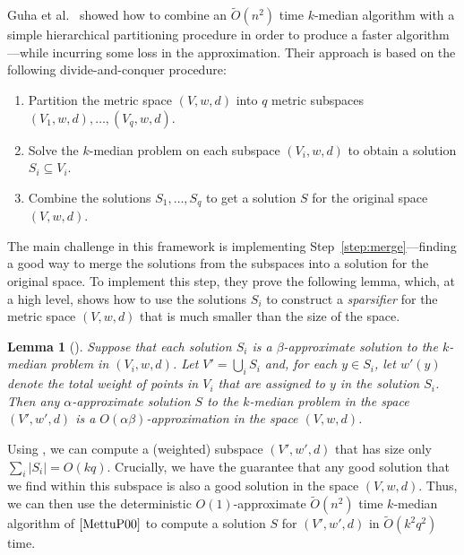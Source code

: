 \documentclass[11pt]{article}
\newcommand{\1}{\mathmybb{1}}
\newtheorem{lemma}[theorem]{Lemma}
\begin{document}
Guha et al.~\cite{focs/GuhaMMO00} showed how to combine an $\tilde O(n^2)$ time $k$-median algorithm with a simple hierarchical partitioning procedure in order to produce a faster algorithm---while incurring some loss in the approximation. Their approach is based on the following divide-and-conquer procedure: 
\begin{enumerate}
    \item Partition the metric space $(V,w,d)$ into $q$ metric subspaces $(V_1,w,d), \dots, (V_q,w,d)$.
    \vspace{-0.2cm}
    \item Solve the $k$-median problem on each subspace $(V_i,w,d)$ to obtain a solution $S_i \subseteq V_i$.
    \vspace{-0.2cm}
    \item Combine the solutions $S_1,\dots,S_q$ to get a solution $S$ for the original space $(V,w,d)$.\label{step:merge}
\end{enumerate}
The main challenge in this framework is implementing Step~\ref{step:merge}---finding a good way to merge the solutions from the subspaces into a solution for the original space. To implement this step, they prove the following lemma, which, at a high level, shows how to use the solutions $S_i$ to construct a \emph{sparsifier} for the metric space $(V,w,d)$ that is much smaller than the size of the space.

\begin{lemma}[\cite{focs/GuhaMMO00}]\label{lem:intro:sparse}
    Suppose that each solution $S_i$ is a $\beta$-approximate solution to the $k$-median problem in $(V_i, w,d)$.
    Let $V' = \bigcup_i S_i$ and, for each $y \in S_i$, let $w'(y)$ denote the total weight of points in $V_i$ that are assigned to $y$ in the solution $S_i$. Then any $\alpha$-approximate solution $S$ to the $k$-median problem in the space $(V', w', d)$ is a $O(\alpha\beta)$-approximation in the space $(V,w,d)$.
\end{lemma}

Using , we can compute a (weighted) subspace $(V', w', d)$ that has size only $\sum_i |S_i| = O(kq)$. Crucially, we have the guarantee that any good solution that we find within this subspace is also a good solution in the space $(V,w,d)$. Thus, we can then use the deterministic $O(1)$-approximate $\tilde O(n^2)$ time $k$-median algorithm of $\cite{MettuP00}$ to compute a solution $S$ for $(V', w', d)$ in $\tilde O(k^2 q^2)$ time.
\end{document}
